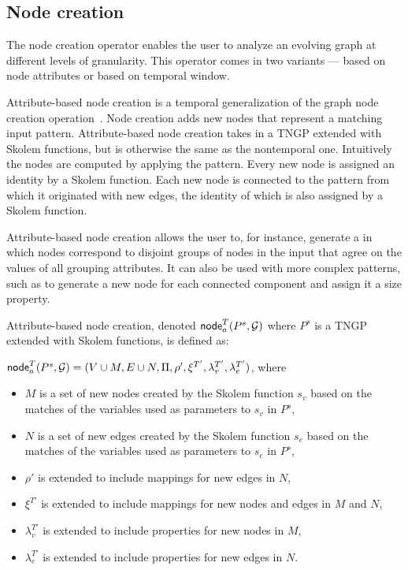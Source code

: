 \subsection{Node creation}

The node creation operator enables the user to analyze an evolving
graph at different levels of granularity.  This operator comes in two
variants --- based on node attributes or based on temporal window.

Attribute-based node creation is a temporal generalization of the
graph node creation operation~\cite{Wood2012}.  Node creation adds new
nodes that represent a matching input pattern.  Attribute-based node
creation takes in a TNGP extended with Skolem functions, but is
otherwise the same as the nontemporal one.  Intuitively the nodes are computed by applying the
pattern.  Every new node is assigned an identity by a Skolem function.
Each new node is connected to the pattern from which it originated
with new edges, the identity of which is also assigned by a Skolem
function.

Attribute-based node creation allows the user to, for instance,
generate a \tg in which nodes correspond to disjoint groups of nodes
in the input that agree on the values of all grouping attributes.  It
can also be used with more complex patterns, such as to generate a new
node for each connected component and assign it a size property.

\begin{definition}
\label{def:nodecra}
Attribute-based node creation, denoted $\textsf{node}^T_a(P^s,\mathcal{G})$
where $P^s$ is a TNGP extended with Skolem functions, is defined as:

$\textsf{node}^T_a(P^s,\mathcal{G}) = (V \cup M, E \cup N, \Pi,\rho',\xi^{T'},\lambda^{T'}_v,\lambda^{T'}_e)$, where

\begin{itemize}[noitemsep,topsep=3pt,itemindent=\dimexpr{}+\relax,leftmargin=5pt]
\item $M$ is a set of new nodes created by the Skolem function $s_v$ based on the matches of the variables used as parameters to $s_v$ in $P^s$,
\item $N$ is a set of new edges created by the Skolem function $s_e$ based on the matches of the variables used as parameters to $s_e$ in $P^s$,
\item $\rho'$ is extended to include mappings for new edges in $N$,
\item $\xi^{T'}$ is extended to include mappings for new nodes and edges in $M$ and $N$,
\item $\lambda^{T'}_v$ is extended to include properties for new nodes in $M$,
\item $\lambda^{T'}_e$ is extended to include properties for new edges in $N$.
\end{itemize}
\end{definition}

